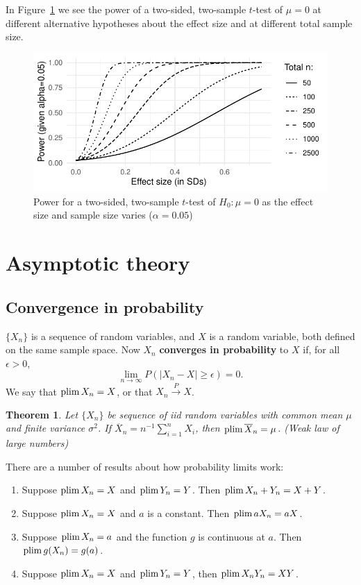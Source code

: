 \documentclass[twoside]{article}
\newtheorem{theorem}{Theorem}%
\begin{document}
In Figure~\ref{fig:power} we see the power of a two-sided, two-sample $t$-test
of $\mu=0$ at different alternative hypotheses about the effect size and at
different total sample size.

\begin{figure}[tb]
\includegraphics[width=\textwidth]{../graphs/powergraph}

\caption{Power for a two-sided, two-sample $t$-test of $H_0: \mu=0$ as the effect 
size and sample size varies ($\alpha=0.05$)}\label{fig:power}
\end{figure}




\section{Asymptotic theory}

\subsection{Convergence in probability}

$\{X_n\}$ is a sequence of random variables, and $X$ is a random variable, both
defined on the same sample space. Now $X_n$ \textbf{converges in probability} to $X$
if, for all $\epsilon>0$,
\[\lim_{n\rightarrow\infty} P( |X_n-X|\geq \epsilon) = 0.\] We say that
$\operatorname{plim} X_n = X$, or that $X_n \xrightarrow{P} X$.

\begin{theorem}
Let $\{X_n\}$ be sequence of iid random variables with common mean $\mu$ and
finite variance $\sigma^2$. If $\overline{X}_n = n^{-1}\sum_{i=1}^n X_i$, then
$\operatorname{plim} \overline{X}_n=\mu$. (Weak law of large numbers)
\end{theorem}

There are a number of results about how probability limits work:
\begin{enumerate}
\item Suppose $\operatorname{plim} X_n=X$ and $\operatorname{plim} Y_n=Y$. Then $\operatorname{plim} X_n+Y_n = X+Y$.
\item Suppose $\operatorname{plim} X_n=X$ and $a$ is a constant. Then $\operatorname{plim} a X_n = aX$.
\item Suppose $\operatorname{plim} X_n=a$ and the function $g$ is continuous at $a$. Then $\operatorname{plim} g(X_n)=g(a)$.
\item Suppose $\operatorname{plim} X_n=X$ and $\operatorname{plim} Y_n=Y$, then $\operatorname{plim} X_nY_n=XY$.
\end{enumerate}
\end{document}
